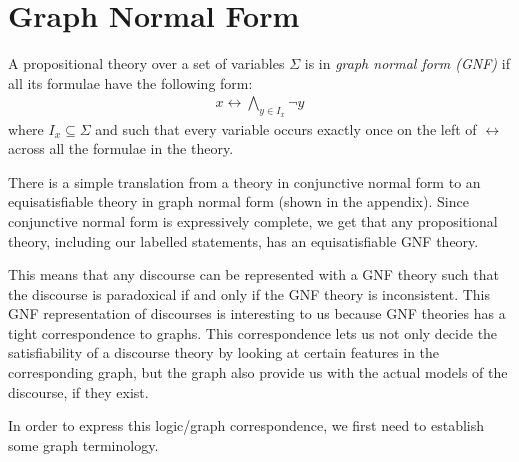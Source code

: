 \section{Graph Normal Form}
\label{sec:Graph Normal Form}
A propositional theory over a set of variables $\Sigma$ is in \textit{graph normal form (GNF)}\cite{apal-digraph} if all its formulae have the following form:
\begin{align}
  x \leftrightarrow \bigwedge_{y \in I_x} \neg y
\end{align}
where $I_x \subseteq \Sigma$ and such that every variable occurs exactly once on the left of $\leftrightarrow$ across all the formulae in the theory.

There is a simple translation from a theory in conjunctive normal form to an equisatisfiable theory in graph normal form (shown in the appendix).
Since conjunctive normal form is expressively complete, we get that any propositional theory, including our labelled statements, has an equisatisfiable GNF theory.

This means that any discourse can be represented with a GNF theory such that the discourse is paradoxical if and only if the GNF theory is inconsistent.
This GNF representation of discourses is interesting to us because GNF theories has a tight correspondence to graphs.
This correspondence lets us not only decide the satisfiability of a discourse theory by looking at certain features in the corresponding graph, but the graph also provide us with the actual models of the discourse, if they exist.

In order to express this logic/graph correspondence, we first need to establish some graph terminology.
